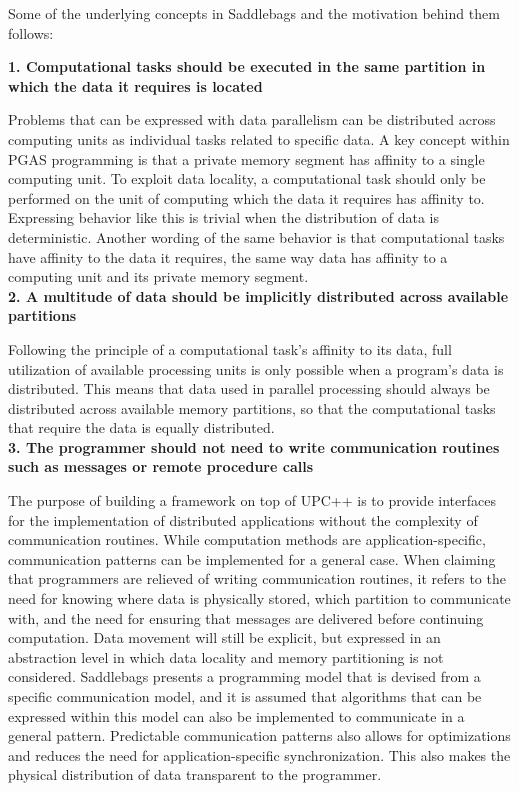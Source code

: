 \documentclass{uit-report}
\begin{document}
Some of the underlying concepts in Saddlebags and the motivation behind them follows:

\hspace{4ex} \textbf{1. Computational tasks should be executed in the same partition in which the data it requires is located}

Problems that can be expressed with data parallelism \cite{data_parallelism} can be distributed across computing units as individual tasks related to specific data. A key concept within PGAS programming is that a private memory segment has affinity to a single computing unit. To exploit data locality, a computational task should only be performed on the unit of computing which the data it requires has affinity to. Expressing behavior like this is trivial when the distribution of data is deterministic. Another wording of the same behavior is that computational tasks have affinity to the data it requires, the same way data has affinity to a computing unit and its private memory segment.
\\

\hspace{4ex} \textbf{2. A multitude of data should be implicitly distributed across available partitions}

Following the principle of a computational task's affinity to its data, full utilization of available processing units is only possible when a program's data is distributed. This means that data used in parallel processing should always be distributed across available memory partitions, so that the computational tasks that require the data is equally distributed.
\\	
\newpage
\hspace{4ex} \textbf{3. The programmer should not need to write communication routines such as messages or remote procedure calls}

The purpose of building a framework on top of UPC++ is to provide interfaces for the implementation of distributed applications without the complexity of communication routines. While computation methods are application-specific, communication patterns can be implemented for a general case. When claiming that programmers are relieved of writing communication routines, it refers to the need for knowing where data is physically stored, which partition to communicate with, and the need for ensuring that messages are delivered before continuing computation. Data movement will still be explicit, but expressed in an abstraction level in which data locality and memory partitioning is not considered. Saddlebags presents a programming model that is devised from a specific communication model, and it is assumed that algorithms that can be expressed within this model can also be implemented to communicate in a general pattern. Predictable communication patterns also allows for optimizations and reduces the need for application-specific synchronization. This also makes the physical distribution of data transparent to the programmer.
\\
\end{document}
